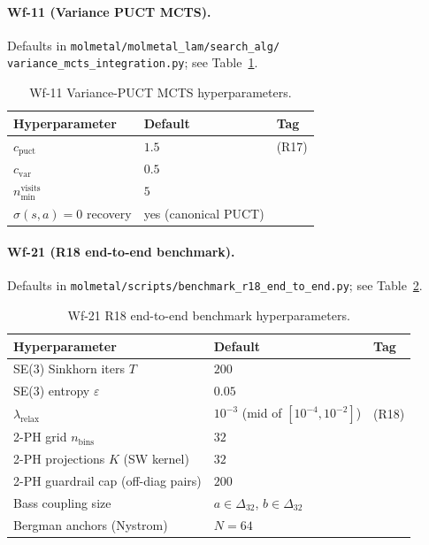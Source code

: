 \paragraph{Wf-11 (Variance PUCT MCTS).}
Defaults in
\texttt{molmetal/molmetal\_lam/search\_alg/
variance\_mcts\_integration.py}; see
Table~\ref{tab:wf11-hparams}.

\begin{table}[h]
  \centering
  \small
  \caption{Wf-11 Variance-PUCT MCTS hyperparameters.}
  \label{tab:wf11-hparams}
  \begin{tabular}{lll}
    \toprule
    \textbf{Hyperparameter} & \textbf{Default} & \textbf{Tag} \\
    \midrule
    $c_{\mathrm{puct}}$ & $1.5$ & \MEASURED{} (R17) \\
    $c_{\mathrm{var}}$ & $0.5$ & \DESIGN{} \\
    $n_{\mathrm{min}}^{\mathrm{visits}}$ & $5$ & \DESIGN{} \\
    $\sigma(s, a) = 0$ recovery & yes (canonical PUCT) & \DESIGN{} \\
    \bottomrule
  \end{tabular}
\end{table}

\paragraph{Wf-21 (R18 end-to-end benchmark).}
Defaults in
\texttt{molmetal/scripts/benchmark\_r18\_end\_to\_end.py}; see
Table~\ref{tab:wf21-hparams}.

\begin{table}[h]
  \centering
  \small
  \caption{Wf-21 R18 end-to-end benchmark hyperparameters.}
  \label{tab:wf21-hparams}
  \begin{tabular}{lll}
    \toprule
    \textbf{Hyperparameter} & \textbf{Default} & \textbf{Tag} \\
    \midrule
    SE(3) Sinkhorn iters $T$ & $200$ & \DESIGN{} \\
    SE(3) entropy $\varepsilon$ & $0.05$ & \DESIGN{} \\
    $\lambda_{\mathrm{relax}}$ & $10^{-3}$ (mid of $[10^{-4},
      10^{-2}]$) & \PROJECTED{} (R18) \\
    2-PH grid $n_{\mathrm{bins}}$ & $32$ & \DESIGN{} \\
    2-PH projections $K$ (SW kernel) & $32$ & \DESIGN{} \\
    2-PH guardrail cap (off-diag pairs) & $200$ & \DESIGN{} \\
    Bass coupling size & $a \in \Delta_{32}$, $b \in \Delta_{32}$
      & \DESIGN{} \\
    Bergman anchors (Nystrom) & $N = 64$ & \DESIGN{} \\
    \bottomrule
  \end{tabular}
\end{table}

